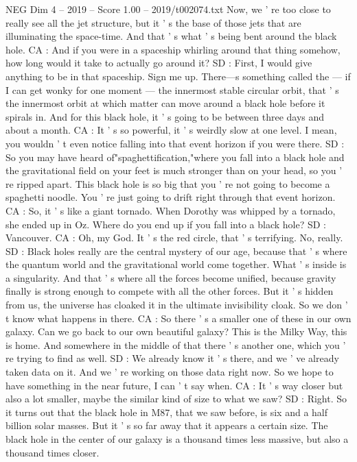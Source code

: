 \begin{textsample}{NEG Dim 4 – 2019 – Score 1.00 – 2019/t002074.txt}
Now, we ' re too close to really see all the jet structure, but it ' s the base of those jets that are illuminating the space-time.
And that ' s what ' s being bent around the black hole.
CA : And if you were in a spaceship whirling around that thing somehow, how long would it take to actually go around it?
SD : First, I would give anything to be in that spaceship.
Sign me up.
There—s something called the — if I can get wonky for one moment — the innermost stable circular orbit, that ' s the innermost orbit at which matter can move around a black hole before it spirals in.
And for this black hole, it ' s going to be between three days and about a month.
CA : It ' s so powerful, it ' s weirdly slow at one level.
I mean, you wouldn ' t even notice falling into that event horizon if you were there.
SD : So you may have heard of"spaghettification,"where you fall into a black hole and the gravitational field on your feet is much stronger than on your head, so you ' re ripped apart.
This black hole is so big that you ' re not going to become a spaghetti noodle.
You ' re just going to drift right through that event horizon.
CA : So, it ' s like a giant tornado.
When Dorothy was whipped by a tornado, she ended up in Oz.
Where do you end up if you fall into a black hole?
SD : Vancouver.
CA : Oh, my God.
It ' s the red circle, that ' s terrifying.
No, really.
SD : Black holes really are the central mystery of our age, because that ' s where the quantum world and the gravitational world come together.
What ' s inside is a singularity.
And that ' s where all the forces become unified, because gravity finally is strong enough to compete with all the other forces.
But it ' s hidden from us, the universe has cloaked it in the ultimate invisibility cloak.
So we don ' t know what happens in there.
CA : So there ' s a smaller one of these in our own galaxy.
Can we go back to our own beautiful galaxy?
This is the Milky Way, this is home.
And somewhere in the middle of that there ' s another one, which you ' re trying to find as well.
SD : We already know it ' s there, and we ' ve already taken data on it.
And we ' re working on those data right now.
So we hope to have something in the near future, I can ' t say when.
CA : It ' s way closer but also a lot smaller, maybe the similar kind of size to what we saw?
SD : Right.
So it turns out that the black hole in M87, that we saw before, is six and a half billion solar masses.
But it ' s so far away that it appears a certain size.
The black hole in the center of our galaxy is a thousand times less massive, but also a thousand times closer.

\end{textsample}
